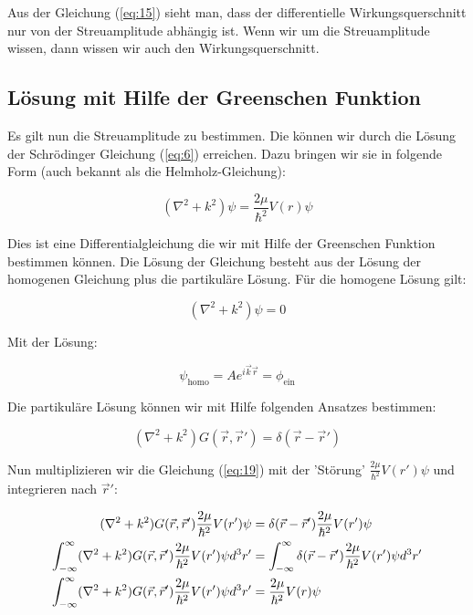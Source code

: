 Aus der Gleichung (\ref{eq:15}) sieht man, dass der differentielle Wirkungsquerschnitt nur von der Streuamplitude abhängig ist. Wenn wir um die Streuamplitude wissen, dann wissen wir auch den Wirkungsquerschnitt.



\subsection*{Lösung mit Hilfe der Greenschen Funktion}


Es gilt nun die Streuamplitude zu bestimmen. Die können wir durch die Lösung der Schrödinger Gleichung (\ref{eq:6})  erreichen. Dazu bringen wir sie in folgende Form (auch bekannt als die Helmholz-Gleichung):

\begin{equation}
  \label{eq:16}
  (\nabla^2 + k^2)\psi = \frac{2\mu}{\hbar^2}V(r)\psi
\end{equation}

Dies ist eine Differentialgleichung die wir mit Hilfe der Greenschen Funktion bestimmen können. Die Lösung der Gleichung besteht aus der Lösung der homogenen Gleichung plus die partikuläre Lösung. Für die homogene Lösung gilt:

\begin{equation}
  \label{eq:17}
   (\nabla^2 + k^2)\psi = 0
\end{equation}

Mit der Lösung:

\begin{equation}
  \label{eq:18}
  \psi_{\text{homo}} =Ae^{i\vec k \vec r} = \phi_{\text{ein}}
\end{equation}

Die partikuläre Lösung können wir mit Hilfe folgenden Ansatzes bestimmen:

\begin{equation}
  \label{eq:19}
   (\nabla^2 + k^2) G(\vec r,\vec r') = \delta(\vec r-\vec r')
\end{equation}

Nun multiplizieren wir die Gleichung (\ref{eq:19}) mit der 'Störung' \(\frac{2\mu}{\hbar^2}V(r')\psi\) und integrieren nach \(\vec r'\):

\begin{align}
  \label{eq:20}
   (\nabla^2 + k^2) G(\vec r,\vec r')\frac{2\mu}{\hbar^2}V(r')\psi &= \delta(\vec r-\vec r')\frac{2\mu}{\hbar^2}V(r')\psi \notag\\
\int_{-\infty}^\infty (\nabla^2 + k^2) G(\vec r,\vec r')\frac{2\mu}{\hbar^2}V(r')\psi d^3 r' &=\int_{-\infty}^\infty \delta(\vec r-\vec r')\frac{2\mu}{\hbar^2}V(r')\psi d^3 r'\notag \\
\int_{-\infty}^\infty (\nabla^2 + k^2) G(\vec r,\vec r')\frac{2\mu}{\hbar^2}V(r')\psi d^3 r' &=\frac{2\mu}{\hbar^2}V(r)\psi
\end{align}

